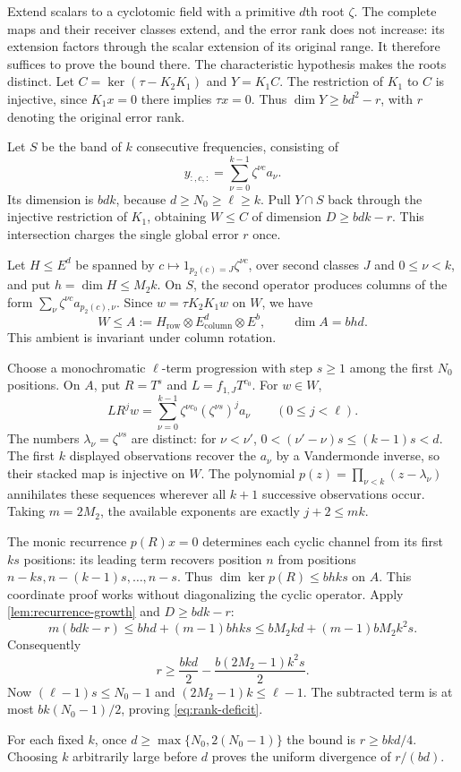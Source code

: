 \begin{outline}
Extend scalars to a cyclotomic field with a primitive $d$th root
$\zeta$.  The complete maps and their receiver classes extend, and the
error rank does not increase: its extension factors through the scalar
extension of its original range.  It therefore suffices to prove the bound
there.  The characteristic hypothesis makes the roots distinct.  Let $C=\ker(\tau-K_2K_1)$ and $Y=K_1C$.
The restriction of $K_1$ to $C$ is injective, since $K_1x=0$ there
implies $\tau x=0$.  Thus $\dim Y\ge bd^2-r$, with $r$ denoting the
original error rank.

Let $S$ be the band of $k$ consecutive frequencies, consisting of
\[
 y_{:,c,:}=\sum_{\nu=0}^{k-1}\zeta^{\nu c}a_\nu.
\]
Its dimension is $bdk$, because $d\ge N_0\ge\ell\ge k$.
Pull $Y\cap S$ back through the injective restriction of $K_1$, obtaining
$W\le C$ of dimension $D\ge bdk-r$.  This intersection charges the
single global error $r$ once.

Let $H\le E^d$ be spanned by
$c\mapsto1_{p_2(c)=J}\zeta^{\nu c}$, over second classes $J$ and
$0\le\nu<k$, and put $h=\dim H\le M_2k$.
On $S$, the second operator produces columns of the form
$\sum_\nu\zeta^{\nu c}a_{p_2(c),\nu}$.
Since $w=\tau K_2K_1w$ on $W$, we have
\[
 W\le A:=H_{\mathrm{row}}\otimes E^d_{\mathrm{column}}\otimes E^b,
 \qquad \dim A=bhd.
\]
This ambient is invariant under column rotation.

Choose a monochromatic $\ell$-term progression with step $s\ge1$
among the first $N_0$ positions.  On $A$, put
$R=T^s$ and $L=f_{1,J}T^{c_0}$.  For $w\in W$,
\[
 LR^jw=\sum_{\nu=0}^{k-1}\zeta^{\nu c_0}
             (\zeta^{\nu s})^j a_\nu\qquad(0\le j<\ell).
\]
The numbers $\lambda_\nu=\zeta^{\nu s}$ are distinct:
for $\nu<\nu'$,
$0<(\nu'-\nu)s\le(k-1)s<d$.
The first $k$ displayed observations recover the $a_\nu$ by a
Vandermonde inverse, so their stacked map is injective on $W$.
The polynomial $p(z)=\prod_{\nu<k}(z-\lambda_\nu)$ annihilates these
sequences wherever all $k+1$ successive observations occur.  Taking
$m=2M_2$, the available exponents are exactly $j+2\le mk$.

The monic recurrence $p(R)x=0$ determines each cyclic channel from
its first $ks$ positions: its leading term recovers position $n$ from
positions $n-ks,n-(k-1)s,\ldots,n-s$.  Thus
$\dim\ker p(R)\le bhks$ on $A$.  This coordinate proof works without
diagonalizing the cyclic operator.
Apply \cref{lem:recurrence-growth} and $D\ge bdk-r$:
\[
 m(bdk-r)\le bhd+(m-1)bhks
 \le bM_2kd+(m-1)bM_2k^2s.
\]
Consequently
\[
 r\ge\frac{bkd}2-\frac{b(2M_2-1)k^2s}2.
\]
Now $(\ell-1)s\le N_0-1$ and
$(2M_2-1)k\le\ell-1$.  The subtracted term is at most
$bk(N_0-1)/2$, proving \cref{eq:rank-deficit}.

For each fixed $k$, once $d\ge\max\{N_0,2(N_0-1)\}$ the bound is
$r\ge bkd/4$.  Choosing $k$ arbitrarily large before $d$ proves the
uniform divergence of $r/(bd)$.
\end{outline}

